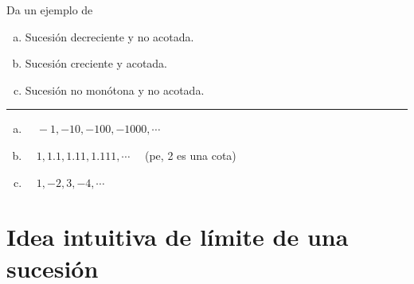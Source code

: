 \vspace{5mm}
\begin{miejercicio}

Da un ejemplo de 

\begin{enumerate}[a) ]	
\vspace{-2mm} \item Sucesión decreciente y no acotada.
\vspace{-2mm} \item Sucesión creciente y acotada.
\vspace{-2mm} \item	Sucesión no monótona y no acotada.
\end{enumerate}

\rule{250pt}{0.1pt}
\vspace{2mm}
\begin{enumerate}[a) ]	
\item $\quad -1,-10,-100,-1000,\cdots$
\item $\quad 1,1.1,1.11,1.111,\cdots \quad$ \textcolor{gris}{(pe, 2 es una cota)}
\item $\quad 1,-2,3,-4,\cdots $
\end{enumerate}

\end{miejercicio}


\vspace{1cm}
\section{Idea intuitiva de límite de una sucesión}
\vspace{0.5cm}

